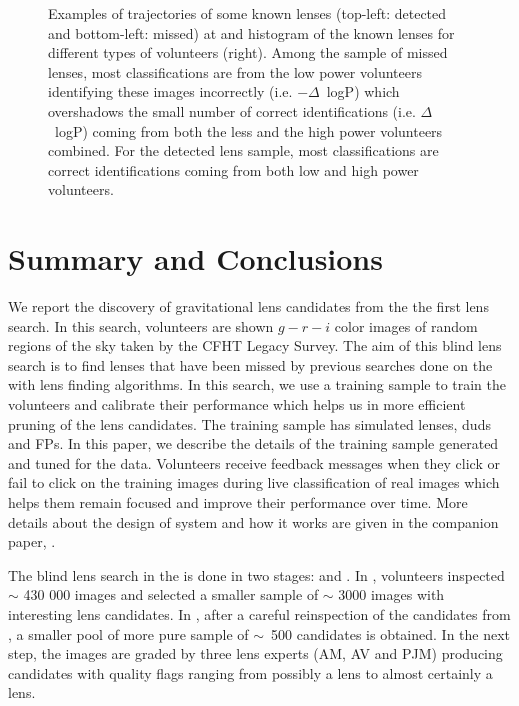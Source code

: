 \documentclass[useAMS,usenatbib,a4paper]{mn2e}
\begin{document}
\begin{figure}
\begin{center}
\caption{ \label{fig:detmis}
Examples of trajectories of some known lenses (top-left: detected and
bottom-left: missed) at \StageOne and histogram of the known lenses for
different types of volunteers (right). Among the sample of missed
lenses, most classifications are from the low power volunteers
identifying these images incorrectly (i.e. $-\Delta$~logP) which
overshadows the small number of correct identifications (i.e.
$\Delta$~logP) coming from both the less and the high power volunteers
combined. For the detected lens sample, most classifications are correct
identifications coming from both low and high power volunteers.
}
\end{center}
\end{figure}



\section{Summary and Conclusions}
\label{sec:conclude}

We report the discovery of gravitational lens candidates from the
the first \sw lens search. In this search, volunteers are shown
$g-r-i$ color images of random regions of the sky taken by the CFHT Legacy
Survey. The aim of this blind lens search is to find lenses that have been
missed by previous searches done on the \cfhtls with lens finding
algorithms. In this search, we use a training sample to train the
volunteers and calibrate their performance which helps us in more
efficient pruning of the lens candidates. The training sample has
simulated lenses, duds and FPs. In this paper, we describe the details
of the training sample generated and tuned for the \cfhtls data.
Volunteers receive feedback messages when they click or fail to click on
the training images during live classification of real images which
helps them remain focused and improve their performance over time. More
details about the design of \sw system and how it works are given in the
companion paper, \PaperOne.

The blind lens search in the \cfhtls is done in two stages: \StageOne and
\StageTwo. In \StageOne, volunteers inspected $\sim$ 430 000 images and
selected a smaller sample of $\sim$ 3000 images with interesting lens
candidates. In \StageTwo, after a careful reinspection of the candidates
from \StageOne, a smaller pool of more pure sample of $\sim$~500
candidates is obtained. In the next step, the images are graded by three
lens experts (AM, AV and PJM) producing candidates with quality flags
ranging from possibly a lens to almost certainly a lens.
\end{document}
